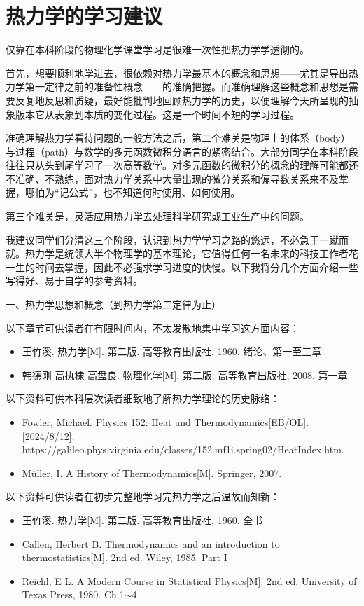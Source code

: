 \documentclass[main.tex]{subfiles}
\begin{document}
\section{热力学的学习建议}
仅靠在本科阶段的物理化学课堂学习是很难一次性把热力学学透彻的。

首先，想要顺利地学进去，很依赖对热力学最基本的概念和思想——尤其是导出热力学第一定律之前的准备性概念——的准确把握。而准确理解这些概念和思想是需要反复地反思和质疑，最好能批判地回顾热力学的历史，以便理解今天所呈现的抽象版本它从表象到本质的变化过程。这是一个时间不短的学习过程。

准确理解热力学看待问题的一般方法之后，第二个难关是物理上的体系（body）与过程（path）与数学的多元函数微积分语言的紧密结合。大部分同学在本科阶段往往只从头到尾学习了一次高等数学。对多元函数的微积分的概念的理解可能都还不准确、不熟练，面对热力学关系中大量出现的微分关系和偏导数关系来不及掌握，哪怕为“记公式”，也不知道何时使用、如何使用。

第三个难关是，灵活应用热力学去处理科学研究或工业生产中的问题。

我建议同学们分清这三个阶段，认识到热力学学习之路的悠远，不必急于一蹴而就。热力学是统领大半个物理学的基本理论，它值得任何一名未来的科技工作者花一生的时间去掌握，因此不必强求学习进度的快慢。以下我将分几个方面介绍一些写得好、易于自学的参考资料。

一、热力学思想和概念（到热力学第二定律为止）

以下章节可供读者在有限时间内，不太发散地集中学习这方面内容：
\begin{itemize}
    \item 王竹溪. 热力学[M]. 第二版. 高等教育出版社, 1960. 绪论、第一至三章
    \item 韩德刚 高执棣 高盘良. 物理化学[M]. 第二版. 高等教育出版社, 2008. 第一章
\end{itemize}
以下资料可供本科层次读者细致地了解热力学理论的历史脉络：
\begin{itemize}
    \item Fowler, Michael. Physics 152: Heat and Thermodynamics[EB/OL]. [2024/8/12]. https://galileo.phys.virginia.edu/classes/152.mf1i.spring02/HeatIndex.htm.
    \item Müller, I. A History of Thermodynamics[M]. Springer, 2007.
\end{itemize}
以下资料可供读者在初步完整地学习完热力学之后温故而知新：
\begin{itemize}
    \item 王竹溪. 热力学[M]. 第二版. 高等教育出版社, 1960. 全书
    \item Callen, Herbert B. Thermodynamics and an introduction to thermostatistics[M]. 2nd ed. Wiley, 1985. Part I
    \item Reichl, E L. A Modern Course in Statistical Physics[M]. 2nd ed. University of Texas Press, 1980. Ch.1$\sim$4
\end{itemize}
\end{document}
